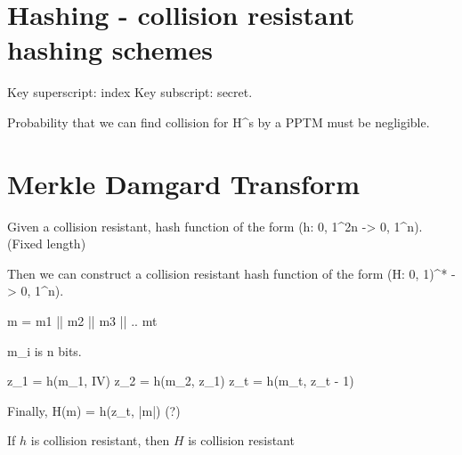 \section{Hashing - collision resistant hashing schemes}

Key superscript: index
Key subscript: secret.

Probability that we can find collision for H^s by a PPTM must be negligible.


\section{Merkle Damgard Transform}

Given a collision resistant, hash function of the form (h: {0, 1}^{2n} -> {0, 1}^n).
(Fixed length)

Then we can construct a collision resistant
hash function of the form (H: {0, 1})^{*} -> {0, 1}^n).

m = m1 || m2 || m3 || .. mt

m_i is n bits.


z_1 = h(m_1, IV)
z_2 = h(m_2, z_1)
z_t = h(m_t, z_{t - 1})

Finally, H(m) = h(z_t, |m|) (?)

If $h$ is collision resistant, then $H$ is collision resistant
